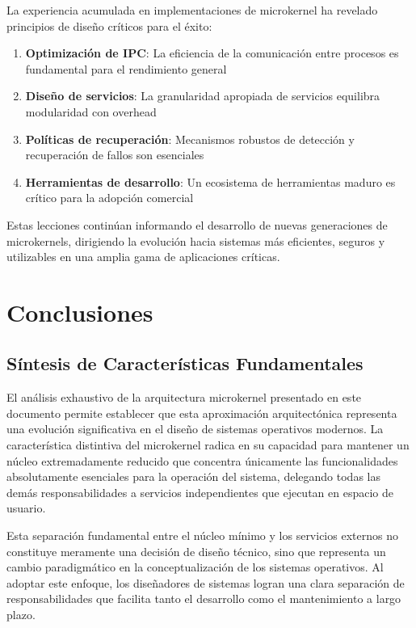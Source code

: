 \documentclass[12pt,a4paper]{article}
\begin{document}
La experiencia acumulada en implementaciones de microkernel ha revelado principios de diseño críticos para el éxito:

\begin{enumerate}
\item \textbf{Optimización de IPC}: La eficiencia de la comunicación entre procesos es fundamental para el rendimiento general
\item \textbf{Diseño de servicios}: La granularidad apropiada de servicios equilibra modularidad con overhead
\item \textbf{Políticas de recuperación}: Mecanismos robustos de detección y recuperación de fallos son esenciales
\item \textbf{Herramientas de desarrollo}: Un ecosistema de herramientas maduro es crítico para la adopción comercial
\end{enumerate}

Estas lecciones continúan informando el desarrollo de nuevas generaciones de microkernels, dirigiendo la evolución hacia sistemas más eficientes, seguros y utilizables en una amplia gama de aplicaciones críticas.

\section{Conclusiones}

\subsection{Síntesis de Características Fundamentales}

El análisis exhaustivo de la arquitectura microkernel presentado en este documento permite establecer que esta aproximación arquitectónica representa una evolución significativa en el diseño de sistemas operativos modernos. La característica distintiva del microkernel radica en su capacidad para mantener un núcleo extremadamente reducido que concentra únicamente las funcionalidades absolutamente esenciales para la operación del sistema, delegando todas las demás responsabilidades a servicios independientes que ejecutan en espacio de usuario.

Esta separación fundamental entre el núcleo mínimo y los servicios externos no constituye meramente una decisión de diseño técnico, sino que representa un cambio paradigmático en la conceptualización de los sistemas operativos. Al adoptar este enfoque, los diseñadores de sistemas logran una clara separación de responsabilidades que facilita tanto el desarrollo como el mantenimiento a largo plazo.
\end{document}
